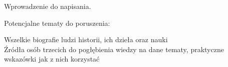 Wprowadzenie do napisania.

\vin Potencjalne tematy do poruszenia: 

Wszelkie biografie ludzi historii, ich dzieła oraz nauki \\
Źródła osób trzecich do pogłębienia wiedzy na dane tematy, praktyczne wskazówki jak z nich korzystać
